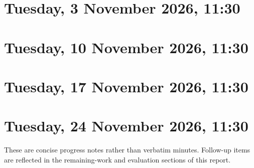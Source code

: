 \section*{Tuesday, 3 November 2026, 11:30}

\section*{Tuesday, 10 November 2026, 11:30}

\section*{Tuesday, 17 November 2026, 11:30}

\section*{Tuesday, 24 November 2026, 11:30}

These are concise progress notes rather than verbatim minutes. Follow-up items
are reflected in the remaining-work and evaluation sections of this report.